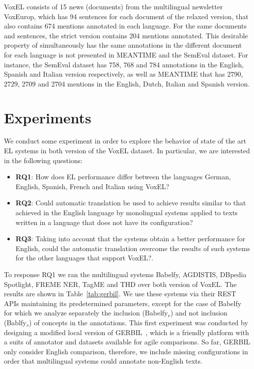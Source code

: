 \documentclass{llncs}
\begin{document}
VoxEL consists of 15 news (documents) from the multilingual newsletter VoxEurop, which has 94 sentences for each document of the relaxed version, that also contains 674 mentions annotated in each language. For the same documents and sentences, the strict version contains 204 mentions annotated. This desirable property of simultaneously has the same annotations in the different document for each language is not presented in MEANTIME and the SemEval dataset. For instance, the SemEval dataset has 758, 768 and 784 annotations in the English, Spanish and Italian version respectively, as well as MEANTIME that has 2790, 2729, 2709 and 2704 mentions in the English, Dutch, Italian and Spanish version. 

\section{Experiments}

We conduct some experiment in order to explore the behavior of state of the art EL systems in both version of the VoxEL dataset. In particular, we are interested in the following questions:
\begin{itemize}
\item \textbf{RQ1}: How does EL performance differ between the languages German, English, Spanish, French and Italian using VoxEL? 
\item \textbf{RQ2}: Could automatic translation be used to achieve results similar to that achieved in the English language by monolingual systems applied to texts written in a language that does not have its configuration?
\item \textbf{RQ3}: Taking into account that the systems obtain a better performance for English, could the automatic translation overcome the results of such systems for the other languages that support VoxEL?.
\end{itemize}

To response RQ1 we ran the multilingual systems Babelfy, AGDISTIS, DBpedia Spotlight, FREME NER, TagME and THD over both version of VoxEL. The results are shown in Table~\ref{tab:gerbil}. We use these systems via their REST APIs maintaining its predetermined parameters, except for the case of Babelfy for which we analyze separately the inclusion (Babelfy$_r$) and not inclusion (Bablfy$_s$) of concepts in the annotations. This first experiment was conducted by designing a modified local version of GERBIL~\cite{gerbil2015}, which is a friendly platform with a suits of annotator and datasets available for agile comparisons. So far, GERBIL only consider English comparison, therefore, we include missing configurations in order that multilingual systems could annotate non-English texts. 
\end{document}
